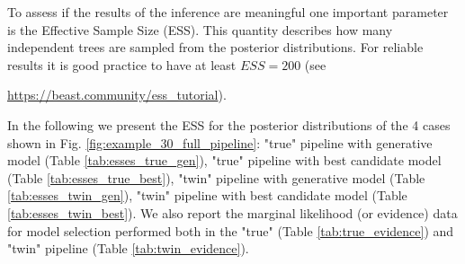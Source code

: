 To assess if the results of the inference are meaningful one important 
parameter is the Effective Sample Size (ESS). This quantity describes how 
many independent trees are sampled from the posterior distributions. 
For reliable results it is good practice to have at 
least $ESS = 200$ (see 
\begin{sloppypar}
  \url{https://beast.community/ess_tutorial}).
\end{sloppypar}
In the following we present the ESS for the posterior distributions of 
the 4 cases shown in Fig. \ref{fig:example_30_full_pipeline}: 
"true" pipeline with generative model (Table \ref{tab:esses_true_gen}), 
"true" pipeline with best candidate model (Table \ref{tab:esses_true_best}), 
"twin" pipeline with generative model (Table \ref{tab:esses_twin_gen}), 
"twin" pipeline with best candidate model (Table \ref{tab:esses_twin_best}). 
We also report the marginal likelihood (or evidence) data for model selection 
performed both in the "true" (Table \ref{tab:true_evidence}) and 
"twin" pipeline (Table \ref{tab:twin_evidence}).

